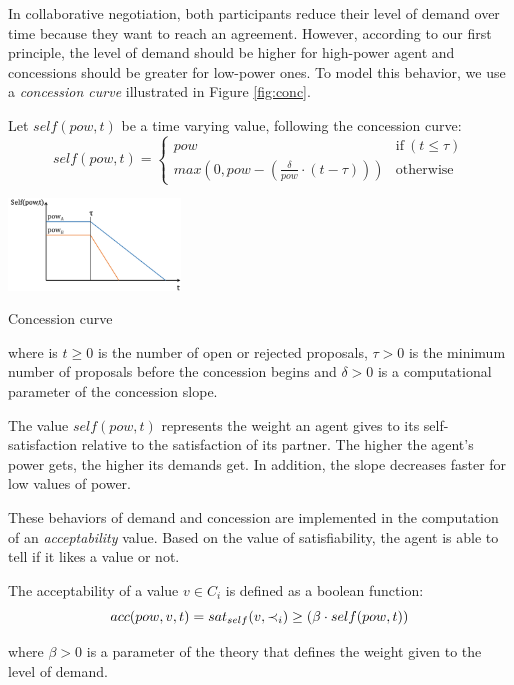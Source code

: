 \documentclass{llncs}
\begin{document}
	In collaborative negotiation, both participants reduce their level of demand over time because they want to reach an agreement. However, according to our first principle, the level of demand should be higher for high-power agent and concessions should be greater for low-power ones. To model this behavior, we use a \emph{concession curve} illustrated in Figure \ref{fig:conc}.
	
	Let $self(pow, t)$ be a time varying value, following the concession curve:
	\begin{equation}
	self(pow, t) = \left\{\begin{array}{ll}
	pow & \mathrm{if\ } (t \leq \tau)\\
	max(0, pow - (\frac{\delta}{pow} \cdot (t - \tau))) & \mathrm{otherwise}
	\end{array}\right.
	\end{equation}
	\begin{floatingfigure}[r]{1.8in}
		\includegraphics[width=1.8in]{graphs/sv3.png}
		\caption{\label{fig:conc}Concession curve}
	\end{floatingfigure} 
	where is $t \geq 0$ is the number of open or rejected proposals, $\tau > 0$ is the minimum number of proposals before the concession begins and $\delta > 0$ is a computational parameter of the concession slope.
	
	The value $self(pow,t)$ represents the weight an agent gives to its self-satisfaction relative to the satisfaction of its partner. The higher the agent's power gets, the higher its demands get. In addition, the slope decreases faster for low values of power.
	
	These behaviors of demand and concession are implemented in the computation of an \textit{acceptability} value. Based on the value of satisfiability, the agent is able to tell if it likes a value or not.
	
	The acceptability of a value $v \in C_i$ is defined as a boolean function:
	\begin{equation}
	\vspace{-.5em} 
	acc(pow,v, t) = sat_{self}(v, \prec_i) \geq  (\beta \cdot self(pow,t))
	\end{equation}
	
	\medskip
	where $\beta>0$ is a parameter of the theory that defines the weight given to the level of demand.
	
\end{document}
